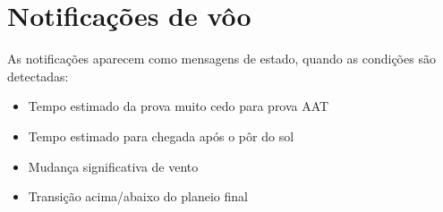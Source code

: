 \section{Notificações de vôo}

As notificações aparecem como mensagens de estado, quando as condições são detectadas:
\begin{itemize}
\item Tempo estimado da prova muito cedo para prova AAT
\item Tempo estimado para chegada após o pôr do sol
\item Mudança significativa de vento
\item Transição acima/abaixo do planeio final 
\end{itemize}
